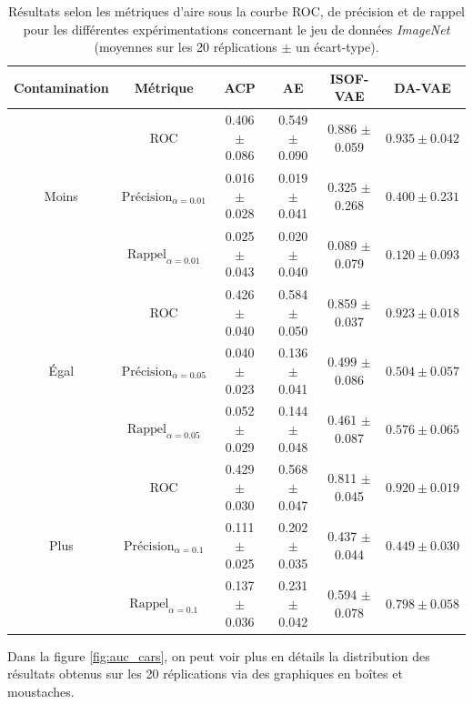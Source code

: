 \begin{table}[h]
	\centering
	\caption{Résultats selon les métriques d'aire sous la courbe ROC, de précision et de rappel pour les différentes expérimentations concernant le jeu de données \textit{ImageNet} (moyennes sur les 20 réplications $\pm$ un écart-type).}
	\begin{tabular}{c|c|c c c c}
		\toprule
		Contamination & Métrique & ACP & AE & ISOF-VAE & DA-VAE \\
		\hline
		\multirow{3}{*}{Moins} 
		& ROC & 0.406 $\pm$ 0.086 & 0.549 $\pm$ 0.090 & 0.886 $\pm$ 0.059 & $\mathbf{0.935 \pm 0.042}$  \\ 
		& $\text{Précision}_{\alpha=0.01}$ & 0.016 $\pm$ 0.028 & 0.019 $\pm$ 0.041 & 0.325 $\pm$ 0.268 & $0.400 \pm 0.231$  \\
		& $\text{Rappel}_{\alpha=0.01}$ & 0.025 $\pm$ 0.043 & 0.020 $\pm$ 0.040 & 0.089 $\pm$ 0.079 & $0.120 \pm 0.093$  \\
		\midrule
		\multirow{3}{*}{Égal} 
		& ROC & 0.426 $\pm$ 0.040 & 0.584 $\pm$ 0.050 & 0.859 $\pm$ 0.037 & $\mathbf{0.923 \pm 0.018}$  \\ 
		& $\text{Précision}_{\alpha=0.05}$ & 0.040 $\pm$ 0.023 & 0.136 $\pm$ 0.041 & 0.499 $\pm$ 0.086 & $0.504 \pm 0.057$  \\
		& $\text{Rappel}_{\alpha=0.05}$ & 0.052 $\pm$ 0.029 & 0.144 $\pm$ 0.048 & 0.461 $\pm$ 0.087 & $\mathbf{0.576 \pm 0.065}$  \\
		\midrule
		\multirow{3}{*}{Plus} 
		& ROC & 0.429 $\pm$ 0.030 & 0.568 $\pm$ 0.047 & 0.811 $\pm$ 0.045 & $\mathbf{0.920 \pm 0.019}$  \\ 
		& $\text{Précision}_{\alpha=0.1}$ & 0.111 $\pm$ 0.025 & 0.202 $\pm$ 0.035 & 0.437 $\pm$ 0.044 & $0.449 \pm 0.030$  \\
		& $\text{Rappel}_{\alpha=0.1}$ & 0.137 $\pm$ 0.036 & 0.231 $\pm$ 0.042 & 0.594 $\pm$ 0.078 & $\mathbf{0.798 \pm 0.058}$  \\
		\midrule
	\end{tabular} 
	\label{tab:results_cars}
\end{table}

Dans la figure \ref{fig:auc_cars}, on peut voir plus en détails la distribution des résultats obtenus sur les 20 réplications via des graphiques en boîtes et moustaches.

